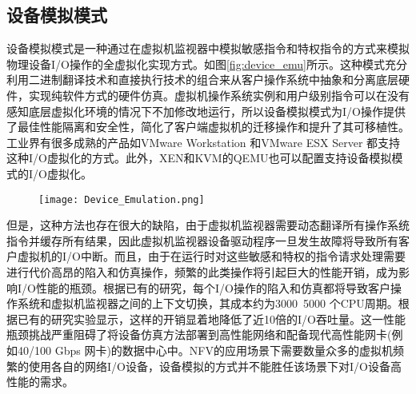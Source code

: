 \subsection{设备模拟模式}
设备模拟模式是一种通过在虚拟机监视器中模拟敏感指令和特权指令的方式来模拟物理设备I/O操作的全虚拟化实现方式。如图\ref{fig:device_emu}所示。这种模式充分利用二进制翻译技术和直接执行技术的组合来从客户操作系统中抽象和分离底层硬件，实现纯软件方式的硬件仿真。虚拟机操作系统实例和用户级别指令可以在没有感知底层虚拟化环境的情况下不加修改地运行，所以设备模拟模式为I/O操作提供了最佳性能隔离和安全性，简化了客户端虚拟机的迁移操作和提升了其可移植性。工业界有很多成熟的产品如VMware Workstation\cite{sugerman2001virtualizing} 和VMware ESX Server\cite{ahmad2003analysis} 都支持这种I/O虚拟化的方式。此外，XEN和KVM的QEMU也可以配置支持设备模拟模式的I/O虚拟化。
\begin{figure}[!htp]
	\centering
	\texttt{[image: Device\_Emulation.png]}
\end{figure}
但是，这种方法也存在很大的缺陷，由于虚拟机监视器需要动态翻译所有操作系统指令并缓存所有结果，因此虚拟机监视器设备驱动程序一旦发生故障将导致所有客户虚拟机的I/O中断。而且，由于在运行时对这些敏感和特权的指令请求处理需要进行代价高昂的陷入和仿真操作，频繁的此类操作将引起巨大的性能开销，成为影响I/O性能的瓶颈。根据已有的研究，每个I/O操作的陷入和仿真都将导致客户操作系统和虚拟机监视器之间的上下文切换，其成本约为3000~5000 个CPU周期。根据已有的研究实验显示，这样的开销显着地降低了近10倍的I/O吞吐量。这一性能瓶颈挑战严重阻碍了将设备仿真方法部署到高性能网络和配备现代高性能网卡(例如40/100 Gbps 网卡)的数据中心中。NFV的应用场景下需要数量众多的虚拟机频繁的使用各自的网络I/O设备，设备模拟的方式并不能胜任该场景下对I/O设备高性能的需求。

